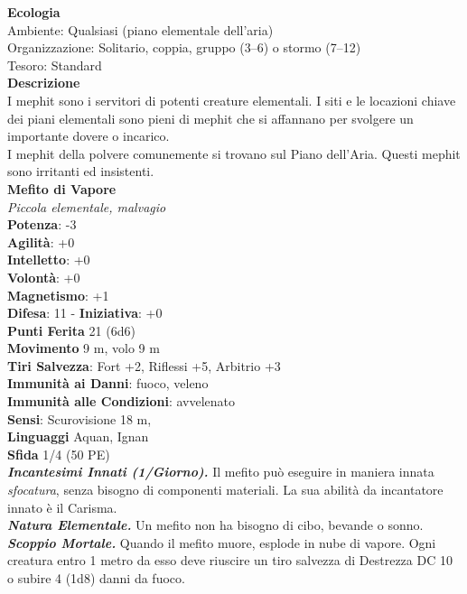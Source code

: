 \begin{multicols}{2}
\textbf{Ecologia}\\
Ambiente: Qualsiasi (piano elementale dell'aria)\\
Organizzazione: Solitario, coppia, gruppo (3–6) o stormo (7–12)\\
Tesoro: Standard\\
\textbf{Descrizione}\\
I mephit sono i servitori di potenti creature elementali. I siti e le locazioni chiave dei piani elementali sono pieni di mephit che si affannano per svolgere un importante dovere o incarico.\\
I mephit della polvere comunemente si trovano sul Piano dell’Aria. Questi mephit sono irritanti ed insistenti.\\


\medskip\textbf{Mefito di Vapore}\\
\emph{Piccola elementale, malvagio}\\
\textbf{Potenza}: -3\\
\textbf{Agilità}: +0\\
\textbf{Intelletto}: +0\\
\textbf{Volontà}: +0\\
\textbf{Magnetismo}: +1\\
\textbf{Difesa}: 11 - \textbf{Iniziativa}: +0\\
\textbf{Punti Ferita} 21 (6d6)\\
\textbf{Movimento} 9 m, volo 9 m\\
\textbf{Tiri Salvezza}: Fort +2, Riflessi +5, Arbitrio +3\\
\textbf{Immunità ai Danni}: fuoco, veleno\\
\textbf{Immunità alle Condizioni}: avvelenato\\
\textbf{Sensi}: Scurovisione 18 m, \\
\textbf{Linguaggi} Aquan, Ignan\\
\textbf{Sfida} 1/4 (50 PE)\smallskip\\
\emph{\textbf{Incantesimi Innati (1/Giorno).}} Il mefito può eseguire in maniera innata \emph{sfocatura}, senza bisogno di componenti materiali. La sua abilità da incantatore innato è il Carisma.\\
\emph{\textbf{Natura Elementale.}} Un mefito non ha bisogno di cibo, bevande o sonno.\\
\emph{\textbf{Scoppio Mortale.}} Quando il mefito muore, esplode in nube di vapore. Ogni creatura entro 1 metro da esso deve riuscire un tiro salvezza di Destrezza DC 10 o subire 4 (1d8) danni da fuoco. \\

\end{multicols}

